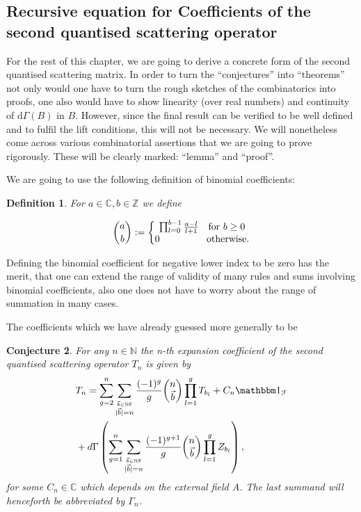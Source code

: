 \documentclass[b5paper,draft,openbib,12pt]{memoir}
\newtheorem{Def}{Definition}
\newtheorem{Conj}[Def]{Conjecture}
\newcommand{\id}{{\mathbbm 1}}
\begin{document}
\subsection{Recursive equation for Coefficients of the second quantised scattering operator}

For the rest of this chapter, we are going to derive a concrete form of the second quantised scattering matrix. In order to turn the ``conjectures'' 
into ``theorems'' not only would one have to turn the rough sketches of the combinatorics into proofs, one also would have to show linearity (over real numbers) and
continuity of \(\mathrm{d}\Gamma(B)\) in \(B\).
However, since the final result can be verified to be well defined and to fulfil the lift conditions, this will not be necessary.
We will nonetheless come across various combinatorial assertions that we are going to prove rigorously. 
These will be clearly marked: ``lemma'' and ``proof''.

We are going to use the following definition of binomial coefficients:
\begin{Def}
For \(a\in\mathbb{C}, b\in\mathbb{Z}\) we define

\begin{equation}
\binom{a}{b} := \left\{\begin{matrix}
\prod_{l=0}^{b-1} \frac{a-l}{l+1} \quad \text{for } b\ge 0\\
0 \hspace{1.7cm} \text{otherwise.}
\end{matrix}\right.
\end{equation}
\end{Def}

Defining the binomial coefficient for negative lower index to be zero has the merit, that one can extend the
range of validity of many rules and sums involving binomial coefficients, also one does not have 
to worry about the range of summation in many cases.



The coefficients which we have already guessed more generally to be

\begin{Conj}\label{thm: T_n recursive}
For any \(n\in\mathbb{N}\) the n-th expansion coefficient of the second quantised scattering operator \(T_n\) is given by
\begin{align}\notag
&T_n = \sum_{g=2}^n \sum_{\stackrel{\vec{b}\in\mathbb{N}^g}{|\vec{b}|=n}}\frac{(-1)^g}{g} 
\binom{n}{\vec{b}} \prod_{l=1}^g T_{b_l} + C_n \id_{\mathcal{F}} \\ \label{T_n recursive}
&+ d\Gamma\left( \sum_{g=1}^n \sum_{\stackrel{\vec{b}\in\mathbb{N}^g}{|\vec{b}|=n}}\frac{(-1)^{g+1}}{g} 
\binom{n}{\vec{b}} \prod_{l=1}^g Z_{b_l}  \right),
\end{align}
for some \(C_n\in \mathbb{C}\) which depends on the external field \(A\). The last summand will henceforth
be abbreviated by \(\Gamma_n\).
\end{Conj}
\end{document}
